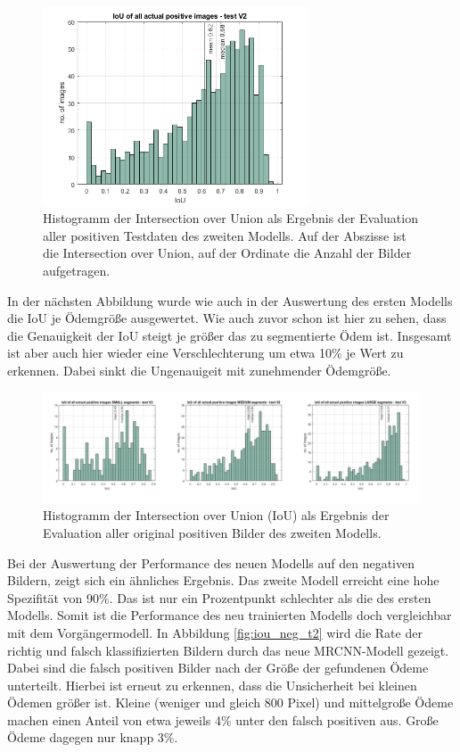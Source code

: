 \begin{figure}[H]
\centering
\includegraphics[width=0.7\textwidth]{./pic/Segmentierung/iou_all_tp_train2.png}
\caption{\label{fig:iou_tp_t2}Histogramm der Intersection over Union als Ergebnis der Evaluation aller positiven
Testdaten des zweiten Modells. Auf der Abszisse ist die Intersection over Union, auf der Ordinate die Anzahl der Bilder
aufgetragen. }
\end{figure}


In der nächsten Abbildung wurde wie auch in der Auswertung des ersten Modells die IoU je Ödemgröße ausgewertet. 
Wie auch zuvor schon ist hier zu sehen, dass die Genauigkeit der IoU steigt je größer das zu segmentierte Ödem ist. 
Insgesamt ist aber auch hier wieder eine Verschlechterung um etwa 10\% je Wert zu erkennen. Dabei sinkt die Ungenauigeit mit zunehmender Ödemgröße.



\begin{figure}[H]
\centering
\includegraphics[width=\textwidth]{./pic/Segmentierung/iou_all_sizes_train2.png}
\caption{\label{fig:iou_allsizes_t2}  Histogramm der Intersection over Union (IoU) als Ergebnis der Evaluation aller original positiven Bilder des zweiten Modells. }
\end{figure}


Bei der Auswertung der Performance des neuen Modells auf den negativen Bildern, zeigt sich ein ähnliches Ergebnis. 
Das zweite Modell erreicht eine hohe Spezifität von 90\%. Das ist nur ein Prozentpunkt schlechter als die des ersten Modells. Somit ist die Performance des neu trainierten Modells doch vergleichbar mit dem Vorgängermodell. 
In Abbildung \ref{fig:iou_neg_t2} wird die Rate der richtig und falsch klassifizierten Bildern durch das neue MRCNN-Modell gezeigt. 
Dabei sind die falsch positiven Bilder nach der Größe der gefundenen Ödeme unterteilt. Hierbei ist erneut zu erkennen, dass die Unsicherheit bei kleinen Ödemen größer ist. Kleine (weniger und gleich 800 Pixel) und mittelgroße Ödeme machen einen Anteil von etwa jeweils 4\% unter den falsch positiven aus. Große Ödeme dagegen nur knapp 3\%.




